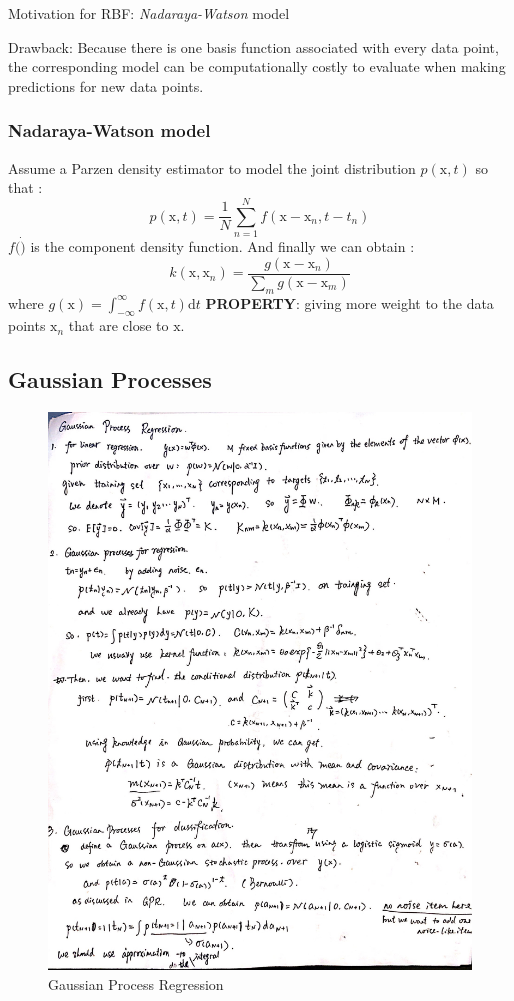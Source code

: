 \documentclass[a4paper]{book}
\begin{document}
Motivation for RBF:   \textit{Nadaraya-Watson} model

Drawback: Because there is one basis function associated with every data point, the corresponding model can be computationally costly to evaluate when making predictions for new data points.
\subsubsection{ Nadaraya-Watson model}
Assume a Parzen density estimator to model the joint distribution $p(\mathrm x, t) $ so that :
\begin{equation}
p(\mathrm x,t) = \frac1N\sum_{n=1}^{N}f(\mathrm x-\mathrm x_n,t-t_n)
\end{equation}
$f(\dot)$ is the component density function. And finally we can obtain :
\begin{equation}
k(\mathrm x,\mathrm x_n) = \frac{g(\mathrm x-\mathrm x_n)}{\sum_mg(\mathrm x-\mathrm x_m)}
\end{equation}
where $g(\mathrm x) = \int_{-\infty}^{\infty}f(\mathrm x,t)\mathrm dt$
\textbf{PROPERTY}:  giving more weight to the data points $\mathrm x_n$ that are close to $\mathrm x$.
\subsection{Gaussian Processes}
\begin{figure}
  \centering
  \includegraphics[width=\textwidth]{./imgs/GPR.jpg}
  \caption{Gaussian Process Regression}\label{fig3.5.1}
\end{figure}
\end{document}
